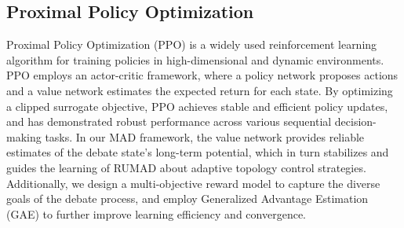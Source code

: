 \subsection{Proximal Policy Optimization}
Proximal Policy Optimization (PPO) \citep{schulmanProximalPolicyOptimization2017a} is a widely used reinforcement learning algorithm for training policies in high-dimensional and dynamic environments. PPO employs an actor-critic framework, where a policy network proposes actions and a value network estimates the expected return for each state. By optimizing a clipped surrogate objective, PPO achieves stable and efficient policy updates, and has demonstrated robust performance across various sequential decision-making tasks.
In our MAD framework, the value network provides reliable estimates of the debate state’s long-term potential, which in turn stabilizes and guides the learning of RUMAD about adaptive topology control strategies. Additionally, we design a multi-objective reward model to capture the diverse goals of the debate process, and employ Generalized Advantage Estimation (GAE) \citep{schulmanHighDimensionalContinuousControl2018} to further improve learning efficiency and convergence.

